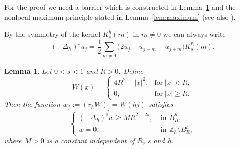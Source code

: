 \documentclass[a4paper,11pt,reqno]{amsart}
\newcommand{\Z}{\mathbb{Z}}
\newtheorem{lem}[thm]{Lemma}
\theoremstyle{definition}
\numberwithin{equation}{section}
\begin{document}
For the proof we need a barrier which is constructed in
Lemma~\ref{lem:barrier} and the nonlocal maximum principle stated in Lemma~\ref{lem:maximum}
(see also \cite{Huang-Oberman}).

By the symmetry of the kernel $K_s^h(m)$ in $m\neq0$ we can always write
\begin{equation}
\label{eq:rewrite}
(-\Delta_h)^su_{j}= \frac{1}{2} \sum_{m\neq 0}
\big(2u_{j}-u_{j-m}-u_{j+m}\big)K^h_s(m).
\end{equation}

\begin{lem}
\label{lem:barrier}
Let $0<s<1$ and $R>0$. Define
$$
W(x)=\begin{cases}
4R^2-|x|^2, & \text{for}~|x|<R, \\
0, &\text{for}~|x|\geq R.
\end{cases}
$$
Then the function $w_j := (r_hW)_j = W(hj)$ satisfies
\[
\begin{cases}
(-\Delta_h)^sw\ge M R^{2-2s},& \text{ in } B_R^h, \\
w=0, & \text{ in } \Z_h\setminus B_R^h,
\end{cases}
\]
where $M>0$ is a constant independent of $R$, $s$ and $h$.
\end{lem}
\end{document}
